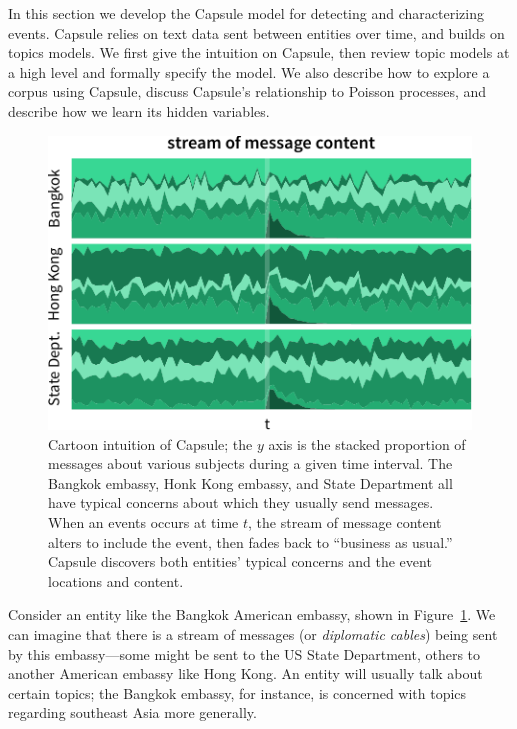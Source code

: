 
In this section we develop the Capsule model for detecting and characterizing events.  Capsule relies on text data sent between entities over time, and builds on topics models. We first give the intuition on Capsule, then review topic models at a high level and formally specify the model.  We also describe how to explore a corpus using Capsule, discuss Capsule's relationship to Poisson processes, and describe how we learn its hidden variables.

\begin{figure}
\centering
\includegraphics[width=\linewidth]{fig/cartoon.pdf}
\caption{Cartoon intuition of Capsule; the $y$ axis is the stacked proportion of messages about various subjects during a given time interval.  The Bangkok embassy, Honk Kong embassy, and State Department all have typical concerns about which they usually send messages.  When an events occurs at time $t$, the stream of message content alters to include the event, then fades back to ``business as usual.''  Capsule discovers both entities' typical concerns and the event locations and content.}
\label{fig:cartoon}
\end{figure}

Consider an entity like the Bangkok American embassy, shown in Figure~\ref{fig:cartoon}.  We can imagine that there is a stream of messages (or \emph{diplomatic cables}) being sent by this embassy---some might be sent to the US State Department, others to another American embassy like Hong Kong.  An entity will usually talk about certain topics; the Bangkok embassy, for instance, is concerned with topics regarding southeast Asia more generally.


